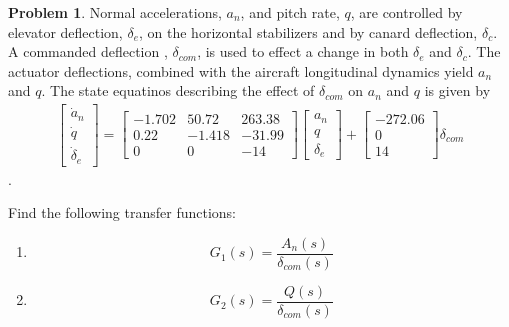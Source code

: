 \documentclass[10pt]{article}
\theoremstyle{definition}
\newtheorem{prob}{Problem}[section]
\newenvironment{subprob}%
{\renewcommand{\theenumi}{\alph{enumi}}\renewcommand{\labelenumi}{(\theenumi)}\begin{enumerate}}%
{\end{enumerate}}%
\begin{document}
\begin{prob}
     Normal accelerations, \( a_n \), and pitch rate, \( q \), are controlled by elevator deflection, \( \delta_e\), on the horizontal stabilizers and by canard deflection, \( \delta_c \).
    A commanded deflection , \( \delta_{com} \), is used to effect a change in both \( \delta_e \) and \( \delta_c\).
    The actuator deflections, combined with the aircraft longitudinal dynamics yield \( a_n \) and \( q\).
    The state equatinos describing the effect of \( \delta_{com} \) on \( a_n \) and \( q\) is given by
    \begin{align*}
        \begin{bmatrix} 
            \dot a_n \\ \dot q \\ \dot \delta_e 
        \end{bmatrix}
        = \begin{bmatrix}
            -1.702 & 50.72 & 263.38 \\
            0.22 & -1.418 & -31.99\\
            0 & 0 & -14
        \end{bmatrix}
        \begin{bmatrix}
            a_n \\ q \\ \delta_e
        \end{bmatrix}
        + 
        \begin{bmatrix}
            -272.06 \\ 0 \\14
        \end{bmatrix}
        \delta_{com} 
    \end{align*} .

    \noindent Find the following transfer functions:
    \begin{subprob}
        \item
            \[
                G_1(s) = \frac{A_n(s)}{\delta_{com}(s)}
            \]
        \item 
            \[
                G_2(s) = \frac{Q(s)}{\delta_{com}(s)}
            \]
    \end{subprob}
\end{prob}
\end{document}
